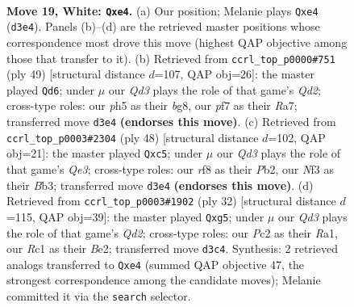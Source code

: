 \documentclass[11pt]{article}
\begin{document}
\clearpage

\begin{figure}[p]\centering
\begin{subfigure}{0.46\textwidth}\centering
\resizebox{\linewidth}{!}{%
\newchessgame
\chessboard[
  setfen={1nbq1r1k/5p2/1p2p1p1/1B5p/3Pp3/r1NQ1NP1/P1P2PP1/2R2K2 w - - 0 19},
  showmover=false,
  pgfstyle=straightmove, color=movearrow, markmove={d3-e4}
]}
\caption{}
\end{subfigure}\hfill
\begin{subfigure}{0.46\textwidth}\centering
\resizebox{\linewidth}{!}{%
\newchessgame
\chessboard[
  setfen={4k1Br/r2q3p/4P1p1/pppp2B1/n7/P4P2/1bP3PP/1K1RQ2R b k - 0 25},
  showmover=false,
  pgfstyle=straightmove, color=movearrow, markmove={d7-d6}
]}
\caption{}
\end{subfigure}
\\[4pt]
\begin{subfigure}{0.46\textwidth}\centering
\resizebox{\linewidth}{!}{%
\newchessgame
\chessboard[
  setfen={6k1/2qrpp2/6p1/p1p2b1p/Pn2N3/1B2QPP1/1PP4P/2K1R3 w - - 0 25},
  showmover=false,
  pgfstyle=straightmove, color=movearrow, markmove={e3-c5}
]}
\caption{}
\end{subfigure}\hfill
\begin{subfigure}{0.46\textwidth}\centering
\resizebox{\linewidth}{!}{%
\newchessgame
\chessboard[
  setfen={2kr3b/pb3p2/2p1pn2/qp2B1p1/2pPP3/2N2P2/PP1QB1P1/R3K3 w Q - 1 17},
  showmover=false,
  pgfstyle=straightmove, color=movearrow, markmove={d2-g5}
]}
\caption{}
\end{subfigure}
\caption{\textbf{Move 19, White: \texttt{Qxe4}.} (a) Our position; Melanie plays \texttt{Qxe4} (\texttt{d3e4}). Panels (b)--(d) are the retrieved master positions whose correspondence most drove this move (highest QAP objective among those that transfer to it). (b) Retrieved from \texttt{ccrl\_top\_p0000\#751} (ply 49) [structural distance $d$=107, QAP obj=26]: the master played \texttt{Qd6}; under $\mu$ our \emph{Qd3} plays the role of that game's \emph{Qd2}; cross-type roles: our \emph{p}h5 as their \emph{b}g8, our \emph{p}f7 as their \emph{R}a7; transferred move \texttt{d3e4} \textbf{(endorses this move)}. (c) Retrieved from \texttt{ccrl\_top\_p0003\#2304} (ply 48) [structural distance $d$=102, QAP obj=21]: the master played \texttt{Qxc5}; under $\mu$ our \emph{Qd3} plays the role of that game's \emph{Qe3}; cross-type roles: our \emph{r}f8 as their \emph{P}b2, our \emph{N}f3 as their \emph{B}b3; transferred move \texttt{d3e4} \textbf{(endorses this move)}. (d) Retrieved from \texttt{ccrl\_top\_p0003\#1902} (ply 32) [structural distance $d$=115, QAP obj=39]: the master played \texttt{Qxg5}; under $\mu$ our \emph{Qd3} plays the role of that game's \emph{Qd2}; cross-type roles: our \emph{P}c2 as their \emph{R}a1, our \emph{R}c1 as their \emph{B}e2; transferred move \texttt{d3c4}. Synthesis: 2 retrieved analogs transferred to \texttt{Qxe4} (summed QAP objective 47, the strongest correspondence among the candidate moves); Melanie committed it via the \texttt{search} selector.}
\label{fig:thought-m36}
\end{figure}
\end{document}
